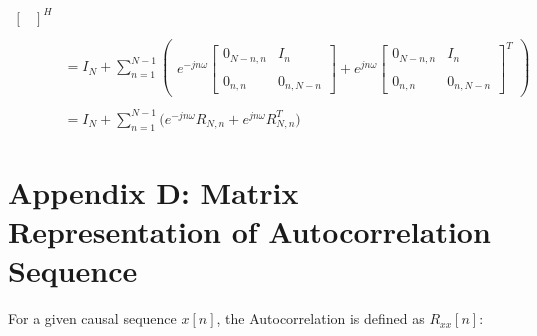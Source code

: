\documentclass{article}
\begin{document}
\begin{align*}
\begin{bmatrix}
                                      \end{bmatrix}^{H} \\ \\
    &= I_{N} + \sum_{n = 1}^{N - 1}\begin{pmatrix}
                                        e^{-jn\omega}\begin{bmatrix}
                                                            0_{N - n, n} & I_{n} \\ \\
                                                            0_{    n, n} & 0_{n, N - n}
                                                       \end{bmatrix} +
                                        e^{ jn\omega}\begin{bmatrix}
                                                            0_{N - n, n} & I_{n} \\ \\
                                                            0_{    n, n} & 0_{n, N - n}
                                                       \end{bmatrix}^{T}
                                     \end{pmatrix} \\ \\
    &= I_{N} + \sum_{n = 1}^{N - 1}\bigg( e^{-jn\omega}R_{N, n} + e^{ jn\omega}R_{N, n}^{T} \bigg)
  \end{align*}

\newpage
\section*{Appendix D: Matrix Representation of Autocorrelation Sequence}

For a given causal sequence $x[n]$, the Autocorrelation is defined as $R_{xx}[n]$:
\end{document}
